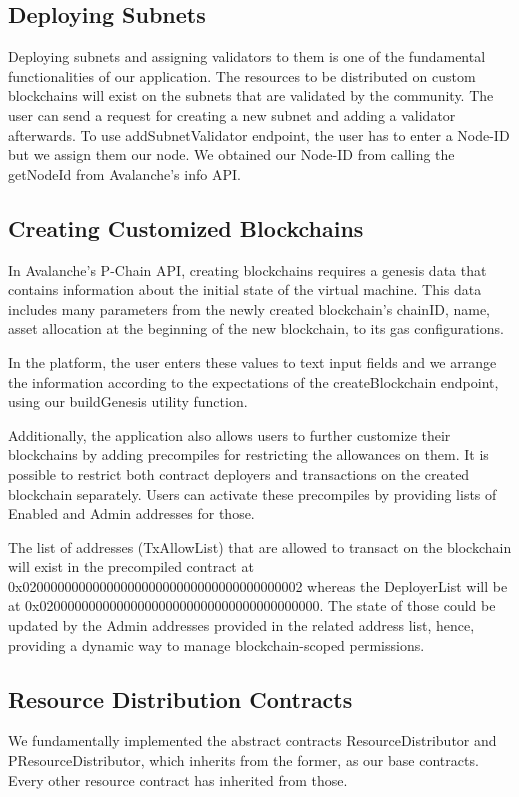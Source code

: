 \documentclass[a4paper,12pt]{report}
\begin{document}
\subsection{Deploying Subnets}
Deploying subnets and assigning validators to them is one of the fundamental functionalities of our application. The resources to be distributed on custom blockchains will exist on the subnets that are validated by the community. 
\newpage
The user can send a request for creating a new subnet and adding a validator afterwards. To use addSubnetValidator endpoint, the user has to enter a Node-ID but we assign them our node. We obtained our Node-ID from calling the getNodeId from Avalanche’s info API.

\subsection{Creating Customized Blockchains}
In Avalanche’s P-Chain API, creating blockchains requires a genesis data that contains information about the initial state of the virtual machine. This data includes many parameters from the newly created blockchain’s chainID, name, asset allocation at the beginning of the new blockchain, to its gas configurations.

In the platform, the user enters these values to text input fields and we arrange the information according to the expectations of the createBlockchain endpoint, using our buildGenesis utility function.

Additionally, the application also allows users to further customize their blockchains by adding precompiles for restricting the allowances on them. It is possible to restrict both contract deployers and transactions on the created blockchain separately. Users can activate these precompiles by providing lists of Enabled and Admin addresses for those.

The list of addresses (TxAllowList) that are allowed to transact on the blockchain will exist in the precompiled contract at 0x0200000000000000000000000000000000000002 whereas the DeployerList will be at 0x0200000000000000000000000000000000000000. The state of those could be updated by the Admin addresses provided in the related address list, hence, providing a dynamic way to manage blockchain-scoped permissions.

\subsection{Resource Distribution Contracts}
We fundamentally implemented the abstract contracts ResourceDistributor and PResourceDistributor, which inherits from the former, as our base contracts. Every other resource contract has inherited from those.
\end{document}
